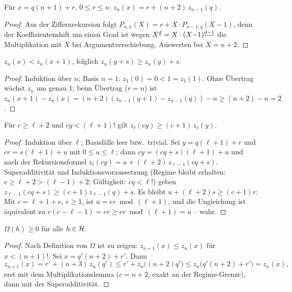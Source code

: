 \begin{lemma}[Rekursionsformel]
Für $x=q(n{+}1)+r$, $0\le r\le n$:
$z_n(x)=r+(n{+}2)\,z_{n-1}(q)$.
\end{lemma}

\begin{proof}
Aus der Ziffernrekursion folgt
$P_{n,x}(X)=r+X\cdot P_{n-1,q}(X{-}1)$, denn der Koeffizientenshift
um einen Grad ist wegen
$X^{\underline{d}}=X\cdot(X{-}1)^{\underline{d-1}}$ die Multiplikation mit $X$ bei
Argumentverschiebung. Auswerten bei $X=n{+}2$.
\end{proof}

\begin{lemma}
$z_n(x)<z_n(x{+}1)$, folglich $z_n(y{+}s)\ge z_n(y)+s$.
\end{lemma}

\begin{proof}
Induktion über $n$; Basis $n=1$: $z_1(0)=0<1=z_1(1)$. Ohne
Übertrag wächst $z_n$ um genau 1; beim
Übertrag ($r=n$) ist
$z_n(x{+}1)-z_n(x)=(n{+}2)(z_{n-1}(q{+}1)-z_{n-1}(q))-n
\ge(n{+}2)-n=2$.
\end{proof}

\begin{lemma}[Multiplikationslemma]
Für $c\ge\ell{+}2$ und $cy<(\ell{+}1)!$ gilt
$z_\ell(cy)\ge(c{+}1)\,z_\ell(y)$.
\end{lemma}

\begin{proof}
Induktion über $\ell$; Basisfälle leer bzw.\ trivial. Sei
$y=q(\ell{+}1)+r$ und $cr=s(\ell{+}1)+u$ mit $0\le u\le\ell$; dann
$cy=(cq{+}s)(\ell{+}1)+u$ und nach der Rekursionsformel
$z_\ell(cy)=u+(\ell{+}2)\,z_{\ell-1}(cq{+}s)$. Superadditivität und
Induktionsvoraussetzung (Regime bleibt erhalten:
$c\ge\ell{+}2>(\ell{-}1){+}2$; Gültigkeit: $cq<\ell!$) geben
$z_{\ell-1}(cq{+}s)\ge(c{+}1)z_{\ell-1}(q)+s$. Es bleibt
$u+(\ell{+}2)s\ge(c{+}1)r$: Mit $c=\ell{+}1{+}e$, $e\ge1$, ist
$u=er\bmod(\ell{+}1)$, und die Ungleichung ist äquivalent zu
$r(c{-}\ell{-}1)=er\ge er\bmod(\ell{+}1)=u$ -- wahr.
\end{proof}

\begin{satz}
$\Omega(h)\ge0$ für alle $h\in\mathcal H$.
\end{satz}

\begin{proof}
Nach Definition von $\Omega$ ist zu zeigen:
$z_{n+1}(x)\le z_n(x)$ für $x<(n{+}1)!$. Sei
$x=q'(n{+}2)+r'$. Dann
\[
z_{n+1}(x)=r'+(n{+}3)\,z_n(q')
\le r'+z_n\bigl((n{+}2)q'\bigr)
\le z_n\bigl(q'(n{+}2)+r'\bigr)=z_n(x),
\]
erst mit dem Multiplikationslemma ($c=n{+}2$, exakt an der
Regime-Grenze), dann mit der Superadditivität.
\end{proof}

